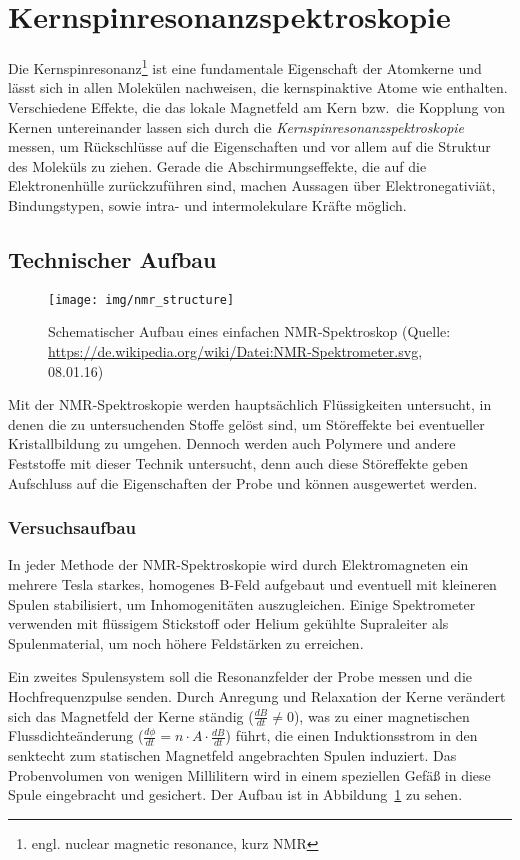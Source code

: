 \section{Kernspinresonanzspektroskopie}
\label{nmr}
Die Kernspinresonanz\footnote{engl. \glqq{}nuclear magnetic resonance\grqq{}, kurz NMR} ist eine fundamentale Eigenschaft der Atomkerne und lässt sich in allen Molekülen nachweisen, die kernspinaktive Atome wie  enthalten.  Verschiedene Effekte, die das lokale Magnetfeld am Kern bzw.\ die Kopplung von Kernen untereinander lassen sich durch die \emph{Kernspinresonanzspektroskopie} messen, um Rückschlüsse auf die Eigenschaften und vor allem auf die Struktur des Moleküls zu ziehen.
Gerade die Abschirmungseffekte, die auf die Elektronenhülle zurückzuführen sind, machen Aussagen über Elektronegativiät, Bindungstypen, sowie intra- und intermolekulare Kräfte möglich.

\subsection{Technischer Aufbau}
\label{nmr:structure}

\begin{figure}
  \centering
  \texttt{[image: img/nmr\_structure]}\label{img:nmr_structure}
  \caption{Schematischer Aufbau eines einfachen NMR-Spektroskop (Quelle:  \url{https://de.wikipedia.org/wiki/Datei:NMR-Spektrometer.svg}, 08.01.16)}
\end{figure}

Mit der NMR-Spektroskopie werden hauptsächlich Flüssigkeiten untersucht, in denen die zu untersuchenden Stoffe gelöst sind, um Störeffekte bei eventueller Kristallbildung zu umgehen. Dennoch werden auch Polymere und andere Feststoffe mit dieser Technik untersucht, denn auch diese Störeffekte geben Aufschluss auf die Eigenschaften der Probe und können ausgewertet werden.

\subsubsection*{Versuchsaufbau}
In jeder Methode der NMR-Spektroskopie wird durch Elektromagneten ein mehrere Tesla starkes, homogenes B-Feld aufgebaut und eventuell mit kleineren Spulen stabilisiert, um Inhomogenitäten auszugleichen. Einige Spektrometer verwenden mit flüssigem Stickstoff oder Helium gekühlte Supraleiter als Spulenmaterial, um noch höhere Feldstärken zu erreichen.

Ein zweites Spulensystem soll die Resonanzfelder der Probe messen und die Hochfrequenzpulse senden. Durch Anregung und Relaxation der Kerne verändert sich das Magnetfeld der Kerne ständig ($ \frac{dB}{dt} \not= 0 $), was zu einer magnetischen Flussdichteänderung ($ \frac{d\phi}{dt} = n \cdot A \cdot \frac{dB}{dt} $) führt, die einen Induktionsstrom in den senktecht zum statischen Magnetfeld angebrachten Spulen induziert.
Das Probenvolumen von wenigen Millilitern wird in einem speziellen Gefä\ss{} in diese Spule eingebracht und gesichert.
Der Aufbau ist in Abbildung~\ref{img:nmr_structure} zu sehen.

